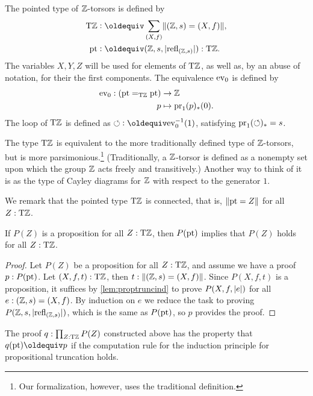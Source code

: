\documentclass[a4paper,12pt]{amsart}
\begin{document}
\begin{definition}\label{def:TorZ}
  The pointed type of $\mathbb{Z}$-torsors is defined by
  \begin{align*}
    \TorZ &\defeq \sum_{(X,f)}\Trunc{(\zet,s)=(X,f)},  \\
    \pt & \defeq (\zet,s,\trunc{\refl{(\zet,s)}}) : \TorZ .
  \end{align*}
  The variables $X,Y,Z$ will be used for elements of ${\mathrm{T}\mathbb{Z}}$,
  as well as, by an abuse of notation, for their the first components.
  The equivalence $\mathrm{ev}_0$ is defined by
  \begin{align*}
    \mathrm{ev}_0: ({\mathord{\mathrm{pt}}} =_{\mathrm{T}\mathbb{Z}} {\mathord{\mathrm{pt}}}) & \to\mathbb{Z} \\
    p & \mapsto \operatorname{pr}_1(p)_*(0).
  \end{align*}
  The loop of ${\mathrm{T}\mathbb{Z}}$ is defined as ${\Zloop}\defeq\ev_0^{-1}(1)$,
  satisfying $\operatorname{pr}_1({\circlearrowleft})_* = s$.
\end{definition}

The type ${\mathrm{T}\mathbb{Z}}$ is equivalent to the more traditionally defined
type of $\mathbb{Z}$-torsors, but is more parsimonious.\footnote{Our formalization, however, uses the traditional definition.}
(Traditionally, a $\mathbb{Z}$-torsor is defined as a nonempty set upon which the group $\mathbb{Z}$ acts freely and transitively.)
Another way to think of it is as the type of Cayley diagrams for $\mathbb{Z}$
with respect to the generator $1$.

We remark that the pointed type ${\mathrm{T}\mathbb{Z}}$ is connected, that is, $\lVert{\mathord{\mathrm{pt}}}=Z\rVert$ for all $Z:{\mathrm{T}\mathbb{Z}}$.


\begin{lemma}\label{lem:dep-elim-TorZ}
If $P(Z)$ is a proposition for all $Z:{\mathrm{T}\mathbb{Z}}$, then $P({\mathord{\mathrm{pt}}})$ implies that $P(Z)$ holds for all $Z:{\mathrm{T}\mathbb{Z}}$.
\end{lemma}

\begin{proof}
Let $P(Z)$ be a proposition for all $Z:{\mathrm{T}\mathbb{Z}}$, and assume we have a proof
$p:P({\mathord{\mathrm{pt}}})$. Let $(X,f,t):{\mathrm{T}\mathbb{Z}}$, then $t :\lVert(\mathbb{Z},s)=(X,f)\rVert$.
Since $P(X,f,t)$ is a proposition, it suffices by \cref{lem:proptruncind}
to prove $P(X,f,\lvert e\rvert)$ for all $e:(\mathbb{Z},s)=(X,f)$.
By induction on $e$ we reduce the task to proving $P(\mathbb{Z},s,\lvert\mathop{{\mathrm{refl}}_{(\mathbb{Z},s)}}\rvert)$, which is
the same as $P({\mathord{\mathrm{pt}}})$, so $p$ provides the proof.
\end{proof}

The proof $q: \prod_{Z:{\mathrm{T}\mathbb{Z}}} P(Z)$ constructed above has the property that $q(\pt)\jdeq p$ if the computation rule for the induction principle
for propositional truncation holds.
\end{document}
